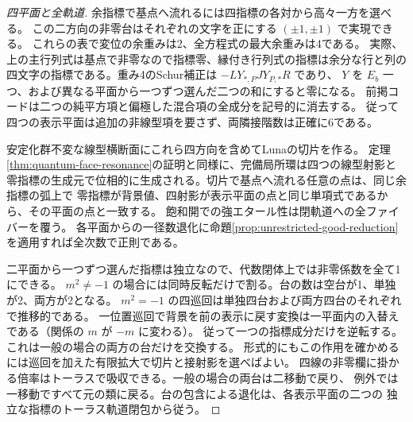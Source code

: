 \begin{proof}[四平面と全軌道]
余指標で基点へ流れるには四指標の各対から高々一方を選べる。
この二方向の非零台はそれぞれの文字を正にする $(\pm1,\pm1)$ で実現できる。
これらの表で変位の余重みは2、全方程式の最大余重みは4である。
実際、上の主行列式は基点で非零なので指標零、縁付き行列式の指標は余分な行と列の
四文字の指標である。重み4のSchur補正は $-LY_{*,P}JY_{P,*}R$ であり、
$Y$ を $E_b$ 一つ、および異なる平面から一つずつ選んだ二つの和にすると零になる。
前掲コードは二つの純平方項と偏極した混合項の全成分を記号的に消去する。
従って四つの表示平面は追加の非線型項を要さず、両隣接階数は正確に6である。

安定化群不変な線型横断面にこれら四方向を含めてLunaの切片を作る。
定理\ref{thm:quantum-face-resonance}の証明と同様に、完備局所環は四つの線型射影と
零指標の生成元で位相的に生成される。切片で基点へ流れる任意の点は、同じ余指標の弧上で
零指標が背景値、四射影が表示平面の点と同じ単項式であるから、その平面の点と一致する。
飽和開での強エタール性は閉軌道への全ファイバーを覆う。
各平面からの一径数退化に命題\ref{prop:unrestricted-good-reduction}を適用すれば全次数で正則である。

二平面から一つずつ選んだ指標は独立なので、代数閉体上では非零係数を全て1にできる。
$m^2\ne-1$ の場合には同時反転だけで割る。台の数は空台が1、単独が2、両方が2となる。
$m^2=-1$ の四巡回は単独四台および両方四台のそれぞれで推移的である。
一位置巡回で背景を前の表示に戻す変換は一平面内の入替えである（関係の $m$ が $-m$ に変わる）。
従って一つの指標成分だけを逆転する。これは一般の場合の両方の台だけを交換する。
形式的にもこの作用を確かめるには巡回を加えた有限拡大で切片と接射影を選べばよい。
四線の非零欄に掛かる倍率はトーラスで吸収できる。一般の場合の両台は二移動で戻り、
例外では一移動ですべて元の類に戻る。台の包含による退化は、各表示平面の二つの
独立な指標のトーラス軌道閉包から従う。
\end{proof}
